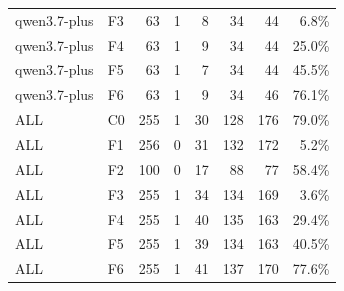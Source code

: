 \begin{tabular}{llrrrrrr}
qwen3.7-plus & F3 & 63 & 1 & 8 & 34 & 44 & 6.8\% \\
qwen3.7-plus & F4 & 63 & 1 & 9 & 34 & 44 & 25.0\% \\
qwen3.7-plus & F5 & 63 & 1 & 7 & 34 & 44 & 45.5\% \\
qwen3.7-plus & F6 & 63 & 1 & 9 & 34 & 46 & 76.1\% \\
ALL & C0 & 255 & 1 & 30 & 128 & 176 & 79.0\% \\
ALL & F1 & 256 & 0 & 31 & 132 & 172 & 5.2\% \\
ALL & F2 & 100 & 0 & 17 & 88 & 77 & 58.4\% \\
ALL & F3 & 255 & 1 & 34 & 134 & 169 & 3.6\% \\
ALL & F4 & 255 & 1 & 40 & 135 & 163 & 29.4\% \\
ALL & F5 & 255 & 1 & 39 & 134 & 163 & 40.5\% \\
ALL & F6 & 255 & 1 & 41 & 137 & 170 & 77.6\% \\
\bottomrule
\end{tabular}

